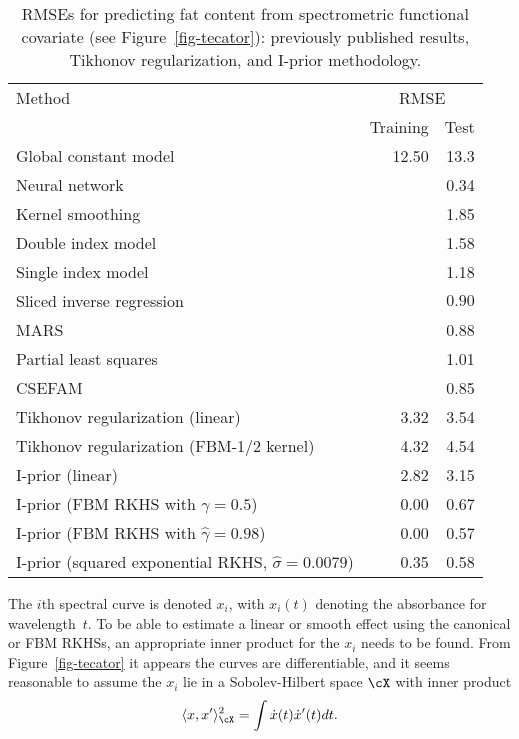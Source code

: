 \documentclass[preprint,12pt,authoryear]{elsarticle}
\begin{document}
\begin{table}[t]
	\centering
	\small
	\begin{tabular}{lrr}\hline
		
		Method                                         & \multicolumn{2}{c}{RMSE} \\
		& Training & Test \\ \hline
		Global constant model                          & 12.50 & 13.3 \\ \hline
		Neural network \citep{vw00}                     &  & 0.34 \\
		Kernel smoothing \cite[Section 7.2]{fv06}      &  &  1.85 \\
		Double index model \citep{chm11}                &  & 1.58 \\
		Single index model \citep{gv14}                 &  & 1.18 \\
		Sliced inverse regression \citep{ll14}          &  & $0.90$ \\ 
		MARS \citep{zyh14}                              &  & 0.88 \\
		Partial least squares \citep{zyh14}             &  & 1.01 \\
		CSEFAM \citep{zyh14}                            &  & 0.85 \\
		\hline
		Tikhonov regularization (linear)               & 3.32 & 3.54 \\
		Tikhonov regularization (FBM-1/2 kernel)       & 4.32 & 4.54 \\ \hline
		I-prior (linear)                                & 2.82 & 3.15 \\
		I-prior (FBM RKHS with $\gamma=0.5    $)                & 0.00 & 0.67 \\
		I-prior (FBM RKHS with $\hat\gamma=0.98$)               & 0.00 & 0.57 \\
		I-prior (squared exponential RKHS, $\hat\sigma=0.0079$) & 0.35 & 0.58 \\
		\hline
	\end{tabular}
	\caption{RMSEs for predicting fat content from spectrometric functional covariate (see Figure~\ref{fig-tecator}): previously published results, Tikhonov regularization, and I-prior methodology.
	}
	\label{tbl-spect}
\end{table}


The $i$th spectral curve is denoted $x_i$, with $x_i(t)$ denoting the absorbance for wavelength~$t$. To be able to estimate a linear or smooth effect using the canonical or FBM RKHSs, an appropriate inner product for the $x_i$ needs to be found. From Figure~\ref{fig-tecator} it appears the curves are differentiable, and it seems reasonable to assume the $x_i$ lie in a Sobolev-Hilbert space $\cX$ with inner product
\[  \langle x,x'\rangle_\cX^2 = \int \dot x(t)\dot x'(t) dt. \]
\end{document}
